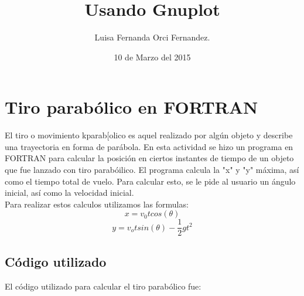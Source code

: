 \documentclass[10pt]{article}
\title{Usando Gnuplot}
\author{Luisa Fernanda Orci Fernandez.}
\date{10 de Marzo del 2015}
\begin{document}
\maketitle
\section{Tiro parabólico en FORTRAN}
El tiro o movimiento kparab[olico  es aquel realizado por algún objeto y describe una trayectoria en forma de parábola.
En esta actividad se hizo un programa en FORTRAN para calcular la posición en ciertos instantes de tiempo de un objeto que fue lanzado con tiro parabóilico. El programa calcula la "x" y "y" máxima, así como el tiempo total de vuelo. Para calcular esto, se le pide al usuario un ángulo inicial, así como la velocidad inicial. \\
Para realizar estos calculos utilizamos las formulas:
$$x = v_0tcos(\theta)$$
$$y = v_otsin(\theta)- \frac{1}{2}gt^2$$

\subsection{Código utilizado}
El código utilizado para calcular el tiro parabólico fue:
\end{document}
